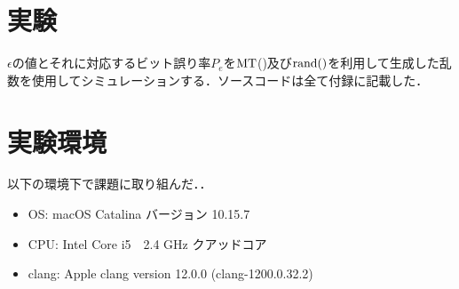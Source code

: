 \documentclass[12pt]{jarticle}
\begin{document}



\section{実験}
$\epsilon$の値とそれに対応するビット誤り率$P_e$を$\rm{MT}$()及び$\rm{rand()}$を利用して生成した乱数を使用してシミュレーションする．ソースコードは全て付録に記載した．

\section{実験環境}
以下の環境下で課題に取り組んだ．．
\begin{itemize}
    \item OS: macOS Catalina バージョン 10.15.7
    \item CPU: Intel Core i5　2.4 GHz クアッドコア
    \item clang: Apple clang version 12.0.0 (clang-1200.0.32.2)
\end{itemize}
\end{document}
